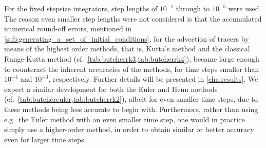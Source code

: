 For the fixed stepsize integrators, step lengths of $10^{-1}$ through to
$10^{-5}$ were used. The reason even smaller step lengths were not considered
is that the accumulated numerical round-off errors, mentioned in
\cref{sub:generating_a_set_of_initial_conditions}, for the advection
of tracers by means of the highest order methods, that is, Kutta's method and
the classical Runge-Kutta method (cf.\ \cref{tab:butcherrk3,tab:butcherrk4}),
became large enough to counteract the inherent accuracies of the methods,
for time steps smaller than $10^{-4}$ and $10^{-3}$, respectively. Further
details will be presented in \cref{cha:results}. We expect a similar development
for both the Euler and Heun methods (cf.\
\cref{tab:butchereuler,tab:butcherrk2}), albeit for even smaller time steps,
due to these methods being less accurate to begin with. Furthermore, rather
than using e.g.\ the Euler method with an even smaller time step, one would in
practice simply use a higher-order method, in order to obtain similar or better
accuracy even for larger time steps.

